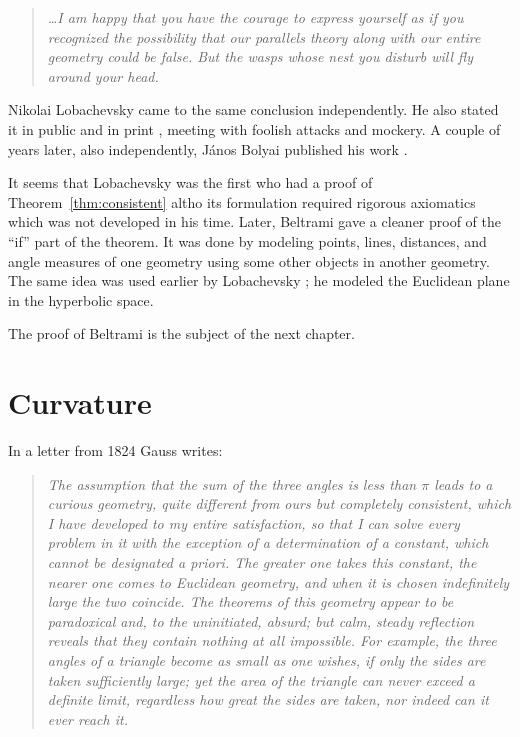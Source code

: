 \smallskip

\begin{quotation}{\it
\dots I am happy that you have the courage to express yourself as if you recognized the possibility that our parallels theory along with our entire geometry could be false.
But the wasps whose nest you disturb will fly around your head.}
\end{quotation}

\smallskip

Nikolai Lobachevsky came to the same conclusion independently.
He also stated it in public and in print \cite{lobachevsky},
meeting with foolish attacks and mockery.
A couple of years later, also independently, János Bolyai published his work \cite{bolyai}.

It seems that Lobachevsky was the first who had a proof of Theorem~\ref{thm:consistent} altho its formulation required rigorous axiomatics which was not developed in his time.
Later, Beltrami gave a cleaner proof of the ``if'' part of the theorem.
It was done by modeling points, lines, distances, and angle measures of one geometry using some other objects in another geometry.
The same idea was used earlier by Lobachevsky \cite[\S34]{lobachevsky-1840}; 
he modeled the Euclidean plane in the hyperbolic space.

The proof of Beltrami is the subject of the next chapter. 

\section{Curvature}

In a letter from 1824 Gauss writes: 

\begin{quotation}{\it
The assumption that the sum of the three angles is less than $\pi$ leads to a curious geometry, 
quite different from ours but completely consistent, 
which I have developed to my entire satisfaction, 
so that I can solve every problem in it with the exception of a determination of a constant, which cannot be designated a priori. 
The greater one takes this constant, the nearer one comes to Euclidean geometry, 
and when it is chosen indefinitely large the two coincide.
The theorems of this geometry appear to be paradoxical and, 
to the uninitiated, absurd; but calm, steady reflection reveals that they contain nothing at all impossible. 
For example, the three angles of a triangle become as small as one wishes, if only the sides are taken sufficiently large; 
yet the area of the triangle can never exceed a definite limit, regardless how great the sides are taken, 
nor indeed can it ever reach it.}
\end{quotation} 

